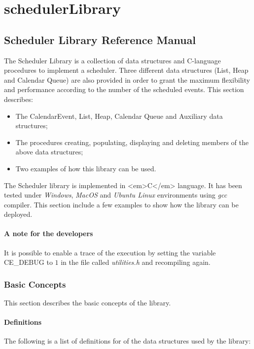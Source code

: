 \section{schedulerLibrary} 

\subsection{Scheduler Library Reference Manual}
The Scheduler Library is a collection of data structures and C-language procedures to implement a scheduler. 
Three different data structures (List, Heap and Calendar Queue) are also provided in order to grant the maximum flexibility and performance according to the number of the scheduled events.
This section describes:
\begin{itemize}
\item	The CalendarEvent, List, Heap, Calendar Queue and Auxiliary data structures;
\item	The procedures creating, populating, displaying and deleting members of the above data structures;
\item	Two examples of how this library can be used.

\end{itemize}

The Scheduler library is implemented in <em>C</em> language. It has been tested under \textit{Windows}, \textit{MacOS} and \textit{Ubuntu Linux} environments
using \textit{gcc} compiler.
This section include a few examples to show how the library can be deployed.

\paragraph{A note for the developers}
It is possible to enable a trace of the execution by setting the variable CE\_DEBUG to $1$
in the file called \textit{utilities.h} and recompiling again.
\subsubsection{Basic Concepts}


This section describes the basic concepts of the library.

\paragraph{Definitions}
The following is a list of definitions for of the data structures used by the library:

